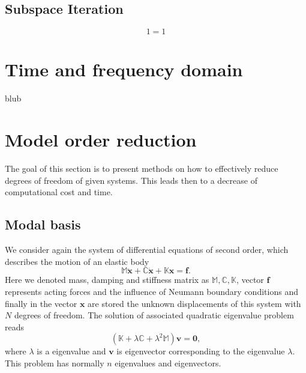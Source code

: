 \documentclass[conference]{journal}%
\newcommand{\bb}[1]{\mathbb{#1}}
\newcommand{\B}[1]{\mathbf{#1}}
\newcommand{\Bx}{\B{x}}
\newcommand{\Bv}{\B{v}}
\begin{document}
	\subsection*{Subspace Iteration}
	\begin{equation}
	1=1
	\end{equation}
	
	
	
	
	
	
	\section{Time and frequency domain}
	blub
	
	\section{Model order reduction}
	The goal of this section is to present methods on how to effectively reduce degrees of freedom of given systems. This leads then to a decrease of computational cost and time.
	
	\subsection{Modal basis}
	We consider again the system of differential equations of second order, which describes the motion of an elastic body
	\begin{equation} \label{eq:3system}
	\bb{M} \ddot{\Bx} + \bb{C} \dot{\Bx} + \bb{K} \Bx = \B{f}.
	\end{equation}
	Here we denoted mass, damping and stiffness matrix as $\bb{M}, \bb{C}, \bb{K}$, vector $\B{f}$ represents acting forces and the influence of Neumann boundary conditions and finally in the vector $\Bx$ are stored the unknown displacements of this system with $N$ degrees of freedom. The solution of associated quadratic eigenvalue problem reads
	\begin{equation} \label{eq:3eigs}
	(\bb{K} + \lambda \bb{C} + \lambda^2 \bb{M}) \Bv = \B{0},
	\end{equation}
	where $\lambda$ is a eigenvalue and $\B{v}$ is eigenvector corresponding to the eigenvalue $\lambda$. This problem has normally $n$ eigenvalues and eigenvectors. 
	
\end{document}
